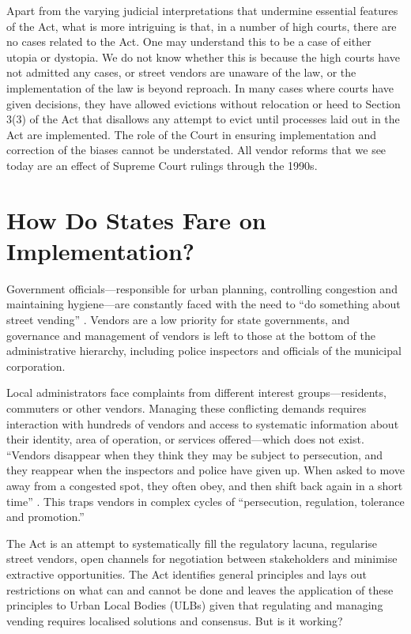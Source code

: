 \documentclass[a4paper, 12pt, twoside]{article}
\begin{document}
{Apart from the varying judicial interpretations that undermine essential features of the Act, what is more intriguing is that, in a number of high courts, there are no cases related to the Act. One may understand this to be a case of either utopia or dystopia. We do not know whether this is because the high courts have not admitted any cases, or street vendors are unaware of the law, or the implementation of the law is beyond reproach. In many cases where courts have given decisions, they have allowed evictions without relocation or heed to Section 3(3) of the Act that disallows any attempt to evict until processes laid out in the Act are implemented. The role of the Court in ensuring implementation and correction of the biases cannot be understated. All vendor reforms that we see today are an effect of Supreme Court rulings through the 1990s.

\section*{How Do States Fare on Implementation?}
	Government officials—responsible for urban planning, controlling congestion and maintaining hygiene—are constantly faced with the need to “do something about street vending” \parencite{bromleypaper}. Vendors are a low priority for state governments, and governance and management of vendors is left to those at the bottom of the administrative hierarchy, including police inspectors and officials of the municipal corporation.

	Local administrators face complaints from different interest groups—residents, commuters or other vendors. Managing these conflicting demands requires interaction with hundreds of vendors and access to systematic information about their identity, area of operation, or services offered—which does not exist. “Vendors disappear when they think they may be subject to persecution, and they reappear when the inspectors and police have given up. When asked to move away from a congested spot, they often obey, and then shift back again in a short time” \parencite{bromleypaper}. This traps vendors in complex cycles of “persecution, regulation, tolerance and promotion.”

	The Act is an attempt to systematically fill the regulatory lacuna, regularise street vendors, open channels for negotiation between stakeholders and minimise extractive opportunities. The Act identifies general principles and lays out restrictions on what can and cannot be done and leaves the application of these principles to Urban Local Bodies (ULBs) given that regulating and managing vending requires localised solutions and consensus. But is it working?

}
\end{document}

